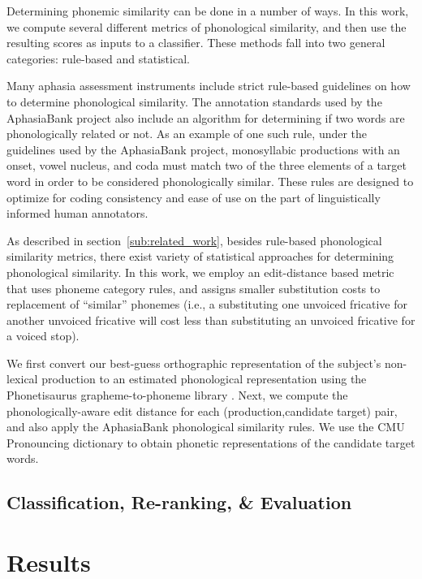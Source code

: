 \documentclass[11pt,letterpaper]{article}
\begin{document}
Determining phonemic similarity can be done in a number of ways. 
In this work, we compute several different metrics of phonological similarity, and then use the resulting scores as inputs to a classifier. 
These methods fall into two general categories: rule-based and statistical.

Many aphasia assessment instruments include strict rule-based guidelines on how to determine phonological similarity.
The annotation standards used by the AphasiaBank project also include an algorithm for determining if two words are phonologically related or not.
As an example of one such rule, under the guidelines used by the AphasiaBank project, monosyllabic productions with an onset, vowel nucleus, and coda must match two of the three elements of a target word in order to be considered phonologically similar.
These rules are designed to optimize for coding consistency and ease of use on the part of linguistically informed human annotators.

As described in section~\ref{sub:related_work}, besides rule-based phonological similarity metrics, there exist variety of statistical approaches for determining phonological similarity. 
In this work, we employ an edit-distance based metric that uses phoneme category rules, and assigns smaller substitution costs to replacement of ``similar'' phonemes (i.e., a substituting one unvoiced fricative for another unvoiced fricative will cost less than substituting an unvoiced fricative for a voiced stop).

We first convert our best-guess orthographic representation of the subject's non-lexical production to an estimated phonological representation using the Phonetisaurus grapheme-to-phoneme library \cite{Novak:2011aa}. 
Next, we compute the phonologically-aware edit distance for each (production,candidate target) pair, and also apply the AphasiaBank phonological similarity rules. We use the CMU Pronouncing dictionary to obtain phonetic representations of the candidate target words.


\subsection{Classification, Re-ranking, \& Evaluation} %
\label{sub:ranking_scoring}


\section{Results}
\end{document}
